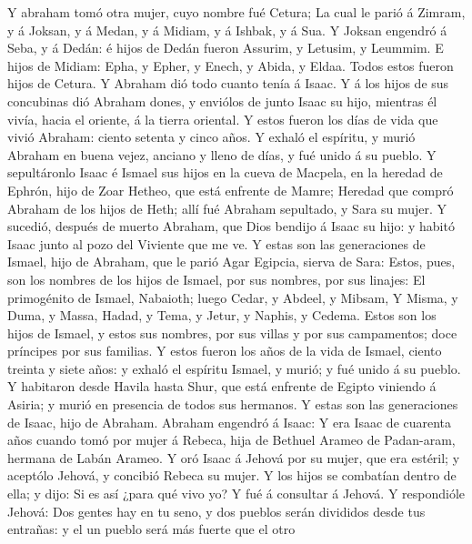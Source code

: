  Y abraham tomó otra mujer, cuyo nombre fué Cetura;
 La cual le parió á Zimram, y á Joksan, y á Medan, y á
Midiam, y á Ishbak, y á Sua.  Y Joksan engendró á Seba, y á
Dedán: é hijos de Dedán fueron Assurim, y Letusim, y Leummim.
 E hijos de Midiam: Epha, y Epher, y Enech, y Abida, y
Eldaa. Todos estos fueron hijos de Cetura.  Y Abraham dió
todo cuanto tenía á Isaac.  Y á los hijos de sus concubinas
dió Abraham dones, y enviólos de junto Isaac su hijo, mientras él vivía,
hacia el oriente, á la tierra oriental.  Y estos fueron los
días de vida que vivió Abraham: ciento setenta y cinco años.
 Y exhaló el espíritu, y murió Abraham en buena vejez,
anciano y lleno de días, y fué unido á su pueblo.  Y
sepultáronlo Isaac é Ismael sus hijos en la cueva de Macpela, en la
heredad de Ephrón, hijo de Zoar Hetheo, que está enfrente de Mamre;
 Heredad que compró Abraham de los hijos de Heth; allí fué
Abraham sepultado, y Sara su mujer.  Y sucedió, después de
muerto Abraham, que Dios bendijo á Isaac su hijo: y habitó Isaac junto
al pozo del Viviente que me ve.  Y estas son las
generaciones de Ismael, hijo de Abraham, que le parió Agar Egipcia,
sierva de Sara:  Estos, pues, son los nombres de los hijos
de Ismael, por sus nombres, por sus linajes: El primogénito de Ismael,
Nabaioth; luego Cedar, y Abdeel, y Mibsam,  Y Misma, y
Duma, y Massa,  Hadad, y Tema, y Jetur, y Naphis, y Cedema.
 Estos son los hijos de Ismael, y estos sus nombres, por
sus villas y por sus campamentos; doce príncipes por sus familias.
 Y estos fueron los años de la vida de Ismael, ciento
treinta y siete años: y exhaló el espíritu Ismael, y murió; y fué unido
á su pueblo.  Y habitaron desde Havila hasta Shur, que está
enfrente de Egipto viniendo á Asiria; y murió en presencia de todos sus
hermanos.  Y estas son las generaciones de Isaac, hijo de
Abraham. Abraham engendró á Isaac:  Y era Isaac de cuarenta
años cuando tomó por mujer á Rebeca, hija de Bethuel Arameo de
Padan-aram, hermana de Labán Arameo.  Y oró Isaac á Jehová
por su mujer, que era estéril; y aceptólo Jehová, y concibió Rebeca su
mujer.  Y los hijos se combatían dentro de ella; y dijo: Si
es así ¿para qué vivo yo? Y fué á consultar á Jehová.  Y
respondióle Jehová: Dos gentes hay en tu seno, y dos pueblos serán
divididos desde tus entrañas: y el un pueblo será más fuerte que el otro
